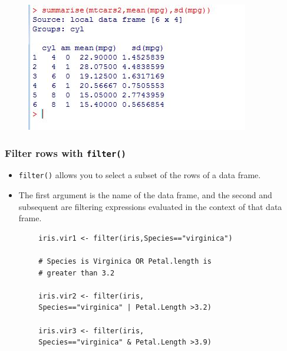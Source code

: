 \documentclass{beamer}
\begin{document}
\begin{frame}
	\begin{figure}
		\centering
		\includegraphics[width=0.9\linewidth]{images/mtcarssummarise}
		\label{fig:mtcarssummarise}
	\end{figure}
\end{frame}


\begin{frame}
	\frametitle{Filter rows with \texttt{filter()}}
	\LARGE
	\vspace{-1.5cm}
	\begin{itemize}
		\item \texttt{filter()} allows you to select a subset of the rows of a data frame. 
		\item The first argument is the name of the data frame, and the second and subsequent are filtering expressions evaluated in the context of that data frame.
	\end{itemize}
	
	
	
\end{frame}
\begin{frame}[fragile]	
	\begin{framed}
		\begin{verbatim}
		iris.vir1 <- filter(iris,Species=="virginica")
		
		# Species is Virginica OR Petal.length is 
		# greater than 3.2
		
		iris.vir2 <- filter(iris,
		Species=="virginica" | Petal.Length >3.2)
		
		iris.vir3 <- filter(iris,
		Species=="virginica" & Petal.Length >3.9)
		
		\end{verbatim}
	\end{framed}
\end{frame}
\end{document}
